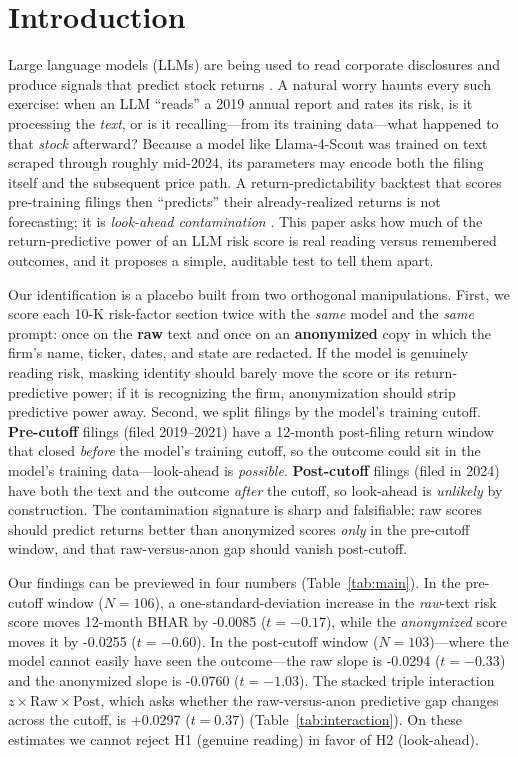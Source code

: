 \documentclass[12pt]{article}
\begin{document}
\section{Introduction}
Large language models (LLMs) are being used to read corporate disclosures and produce
signals that predict stock returns \citep{lopezlira2023,kim2024,jha2024}. A natural worry
haunts every such exercise: when an LLM ``reads'' a 2019 annual report and rates its risk,
is it processing the \emph{text}, or is it recalling---from its training data---what
happened to that \emph{stock} afterward? Because a model like Llama-4-Scout was trained on
text scraped through roughly mid-2024, its parameters may encode both the filing itself and
the subsequent price path. A return-predictability backtest that scores pre-training filings
then ``predicts'' their already-realized returns is not forecasting; it is
\emph{look-ahead contamination} \citep{glasserman2023,sarkar2024}. This paper asks how much
of the return-predictive power of an LLM risk score is real reading versus remembered
outcomes, and it proposes a simple, auditable test to tell them apart.

Our identification is a placebo built from two orthogonal manipulations. First, we score
each 10-K risk-factor section twice with the \emph{same} model and the \emph{same} prompt:
once on the \textbf{raw} text and once on an \textbf{anonymized} copy in which the firm's
name, ticker, dates, and state are redacted. If the model is genuinely reading risk, masking
identity should barely move the score or its return-predictive power; if it is recognizing
the firm, anonymization should strip predictive power away. Second, we split filings by the
model's training cutoff. \textbf{Pre-cutoff} filings (filed 2019--2021) have a 12-month
post-filing return window that closed \emph{before} the model's training cutoff, so the
outcome could sit in the model's training data---look-ahead is \emph{possible}.
\textbf{Post-cutoff} filings (filed in 2024) have both the text and the outcome \emph{after}
the cutoff, so look-ahead is \emph{unlikely} by construction. The contamination signature is
sharp and falsifiable: raw scores should predict returns better than anonymized scores
\emph{only} in the pre-cutoff window, and that raw-versus-anon gap should vanish post-cutoff.

Our findings can be previewed in four numbers (Table~\ref{tab:main}). In the pre-cutoff
window ($N=106$), a one-standard-deviation increase in the \emph{raw}-text risk score moves
12-month BHAR by -0.0085 ($t=-0.17$), while the \emph{anonymized} score moves it by -0.0255
($t=-0.60$). In the post-cutoff window ($N=103$)---where the model cannot easily have seen
the outcome---the raw slope is -0.0294 ($t=-0.33$) and the anonymized slope is -0.0760
($t=-1.03$). The stacked triple interaction $z\times\text{Raw}\times\text{Post}$, which asks
whether the raw-versus-anon predictive gap changes across the cutoff, is +0.0297 ($t=0.37$)
(Table~\ref{tab:interaction}). On these estimates we cannot reject H1 (genuine reading) in
favor of H2 (look-ahead).
\end{document}
